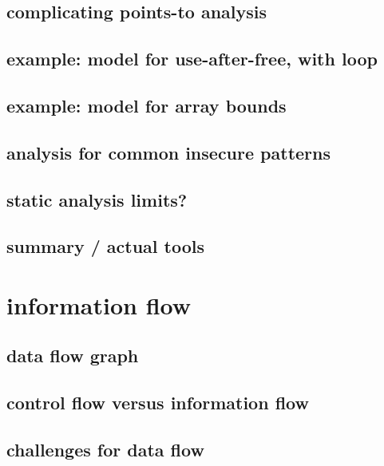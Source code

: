 \subsection{complicating points-to analysis}


\subsection{example: model for use-after-free, with loop}


\subsection{example: model for array bounds}


\subsection{analysis for common insecure patterns}


\subsection{static analysis limits?}


\subsection{summary / actual tools}


\section{information flow}


\subsection{data flow graph}


\subsection{control flow versus information flow} 


\subsection{challenges for data flow}


